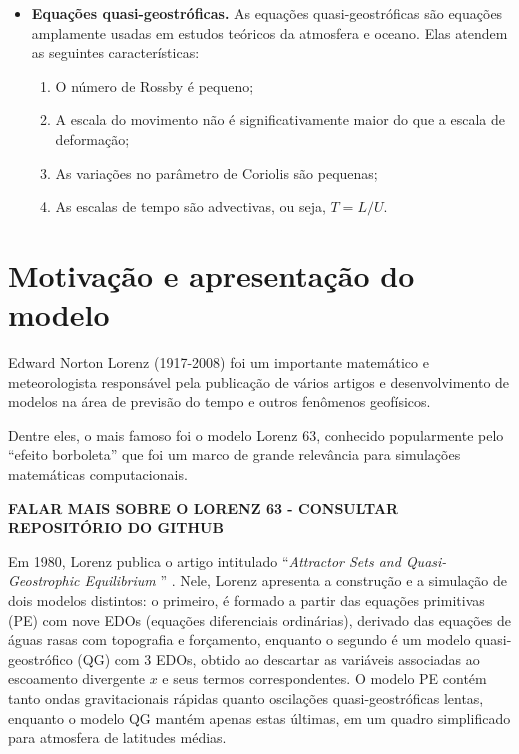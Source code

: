 \begin{itemize}
    \item \textbf{Equações quasi-geostróficas.} As equações quasi-geostróficas são equações  amplamente usadas em estudos teóricos da atmosfera e oceano. Elas atendem as seguintes características:
    \begin{enumerate}
        \item O número de Rossby é pequeno;
        \item A escala do movimento não é significativamente maior do que a escala de deformação;
        \item As variações no parâmetro de Coriolis são pequenas;
        \item As escalas de tempo são advectivas, ou seja, $T=L/U$.
    \end{enumerate}
\end{itemize}



\section{Motivação e apresentação do modelo} \label{sec:ch01_apresentacao_do_modelo}

Edward Norton Lorenz (1917-2008) foi um importante matemático e meteorologista responsável pela publicação de vários artigos e desenvolvimento de modelos na área de previsão do tempo e outros fenômenos geofísicos.

Dentre eles, o mais famoso foi o modelo Lorenz 63, conhecido popularmente pelo ``efeito borboleta'' que foi um marco de grande relevância para simulações matemáticas computacionais. 

\textbf{FALAR MAIS SOBRE O LORENZ 63 - CONSULTAR REPOSITÓRIO DO GITHUB}

Em 1980, Lorenz publica o artigo intitulado ``\textit{Attractor Sets and Quasi-Geostrophic Equilibrium }'' \citep{Lorenz1980}. Nele, Lorenz apresenta a construção e a simulação de dois modelos distintos: o primeiro, é formado a partir das equações primitivas (PE) com nove EDOs (equações diferenciais ordinárias), derivado das equações de águas rasas com topografia e forçamento, enquanto o segundo é um modelo quasi-geostrófico (QG) com 3 EDOs, obtido ao descartar as variáveis associadas ao escoamento divergente $x$ e seus termos correspondentes. O modelo PE contém tanto ondas gravitacionais rápidas quanto oscilações quasi-geostróficas lentas, enquanto o modelo QG mantém apenas estas últimas, em um quadro simplificado para atmosfera de latitudes médias.


